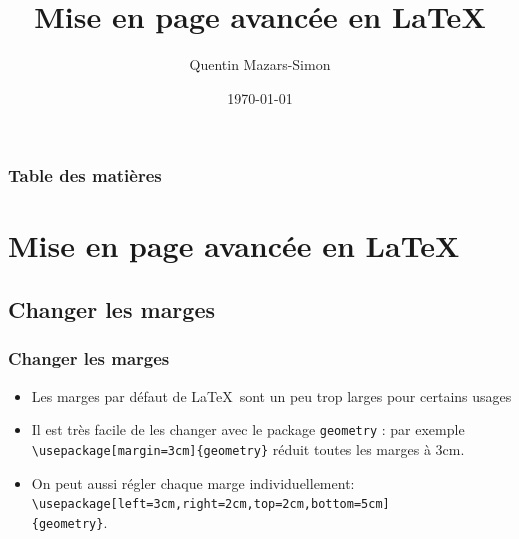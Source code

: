 \documentclass{clic_latex_beamer}
\begin{document}
\title{Mise en page avancée en \LaTeX}
\author{Quentin Mazars-Simon}
\date{\today}
\titlegraphic{\ccbysa}

\frame{\titlepage}


\begin{frame}
\frametitle{Table des matières}
\tableofcontents[]
\end{frame}


\section{Mise en page avancée en \LaTeX}



\subsection{Changer les marges}
\begin{frame}
\frametitle{Changer les marges}
    \begin{itemize}
    \item Les marges par défaut de \LaTeX\ sont un peu trop larges pour certains usages
    \item Il est très facile de les changer avec le package \texttt{geometry} : par exemple \texttt{\textbackslash usepackage[margin=3cm]\{geometry\}} réduit toutes les marges à 3cm.
    \item On peut aussi régler chaque marge individuellement: \texttt{\textbackslash usepackage[left=3cm,right=2cm,top=2cm,bottom=5cm]\\\{geometry\}}.
    \end{itemize}
 \end{frame}
 
\end{document}
